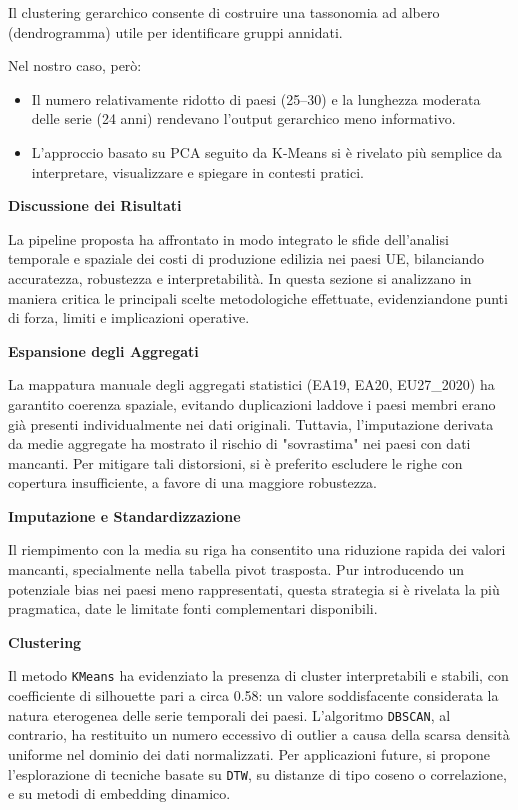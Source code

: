 \documentclass[conference]{IEEEtran}
\begin{document}
\begin{itemize}
{Il clustering gerarchico consente di costruire una tassonomia ad albero (dendrogramma) utile per identificare gruppi annidati.

Nel nostro caso, però:
\begin{itemize}
    \item Il numero relativamente ridotto di paesi (25–30) e la lunghezza moderata delle serie (24 anni) rendevano l’output gerarchico meno informativo.
    \item L’approccio basato su PCA seguito da K-Means si è rivelato più semplice da interpretare, visualizzare e spiegare in contesti pratici.
\end{itemize}


\noindent\textbf{Discussione dei Risultati}


La pipeline proposta ha affrontato in modo integrato le sfide dell’analisi temporale e spaziale dei costi di produzione edilizia nei paesi UE, bilanciando accuratezza, robustezza e interpretabilità. In questa sezione si analizzano in maniera critica le principali scelte metodologiche effettuate, evidenziandone punti di forza, limiti e implicazioni operative.

\noindent\textbf{Espansione degli Aggregati}

La mappatura manuale degli aggregati statistici (EA19, EA20, EU27\_2020) ha garantito coerenza spaziale, evitando duplicazioni laddove i paesi membri erano già presenti individualmente nei dati originali. Tuttavia, l’imputazione derivata da medie aggregate ha mostrato il rischio di "sovrastima" nei paesi con dati mancanti. Per mitigare tali distorsioni, si è preferito escludere le righe con copertura insufficiente, a favore di una maggiore robustezza.

\noindent\textbf{Imputazione e Standardizzazione}

Il riempimento con la media su riga ha consentito una riduzione rapida dei valori mancanti, specialmente nella tabella pivot trasposta. Pur introducendo un potenziale bias nei paesi meno rappresentati, questa strategia si è rivelata la più pragmatica, date le limitate fonti complementari disponibili.

\noindent\textbf{Clustering}

Il metodo \texttt{KMeans} ha evidenziato la presenza di cluster interpretabili e stabili, con coefficiente di silhouette pari a circa 0.58: un valore soddisfacente considerata la natura eterogenea delle serie temporali dei paesi. L’algoritmo \texttt{DBSCAN}, al contrario, ha restituito un numero eccessivo di outlier a causa della scarsa densità uniforme nel dominio dei dati normalizzati. Per applicazioni future, si propone l’esplorazione di tecniche basate su \texttt{DTW}, su distanze di tipo coseno o correlazione, e su metodi di embedding dinamico.



}
\end{itemize}
\end{document}
